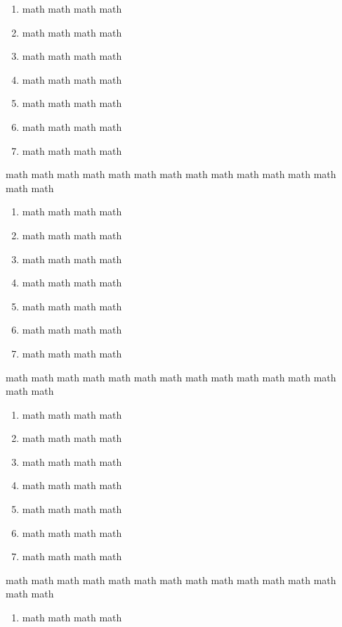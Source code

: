 \documentclass[12pt,a4paper]{article}
\begin{document}
\begin{multicols}{2}
\begin{Exercice}
\begin{enumerate}[label=\textbf{\color{gris}\arabic*.}]
    \item math math math math
    \item math math math math
    \item math math math math
    \item math math math math
    \item math math math math
    \item math math math math
    \item math math math math
\end{enumerate}
\end{Exercice}
\begin{Exercice}math math math math math math math math math math math math math math math
\begin{enumerate}[label=\textbf{\color{gris}\arabic*.}]
    \item math math math math
    \item math math math math
    \item math math math math
    \item math math math math
    \item math math math math
    \item math math math math
    \item math math math math
\end{enumerate}
\end{Exercice}
\begin{Exercice}math math math math math math math math math math math math math math math
\begin{enumerate}[label=\textbf{\color{gris}\arabic*.}]
    \item math math math math
    \item math math math math
    \item math math math math
    \item math math math math
    \item math math math math
    \item math math math math
    \item math math math math
\end{enumerate}
\end{Exercice}
\begin{Exercice}math math math math math math math math math math math math math math math
\begin{enumerate}[label=\textbf{\color{gris}\arabic*.}]
    \item math math math math

\end{enumerate}
\end{Exercice}
\end{multicols}
\end{document}
